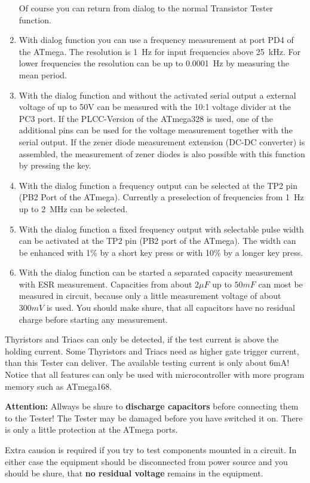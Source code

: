 \begin{enumerate}
Of course you can return from dialog to the normal Transistor Tester function.
\item With dialog function you can use a frequency measurement at port PD4 of the ATmega.
The resolution is 1~Hz for input frequencies above 25~kHz.
For lower frequencies the resolution can be up to 0.0001~Hz by measuring the mean period.
\item With the dialog function and without the activated serial output a external voltage of up to 50V can be measured with
the 10:1 voltage divider at the PC3 port. If the PLCC-Version of the ATmega328 is used, one of the additional
pins can be used for the voltage measurement together with the serial output.
If the zener diode measurement extension (DC-DC converter) is assembled, the measurement of
zener diodes is also possible with this function by pressing the key.
\item With the dialog function a frequency output can be selected at the TP2 pin (PB2 Port of the ATmega).
Currently a preselection of frequencies from 1~Hz up to 2~MHz can be selected.
\item With the dialog function a fixed frequency output with selectable pulse width can be activated at the TP2 pin
(PB2 port of the ATmega). The width can be enhanced with 1\% by a short key press or with 10\% by a longer key press.
\item With the dialog function can be started a separated capacity measurement with ESR measurement.
Capacities from about \(2 \mu F\) up to \(50 mF\) can most be measured in circuit, because only a little
measurement voltage of about \(300 mV\) is used.
You should make shure, that all capacitors have no residual charge before starting any measurement.

\end{enumerate}

Thyristors and Triacs can only be detected, if the test current is above the holding current.
Some Thyristors and Triacs need as higher gate trigger current, than this Tester can deliver.
The available testing current is only about 6mA!
Notice that all features can only be used with microcontroller with more program memory such as ATmega168.

\vspace{1cm}
\textbf{{\Large Attention:}} Allways be shure to {\bf discharge capacitors} before connecting them to the Tester!
The Tester may be damaged before you have switched it on. There is only a little protection at the ATmega ports.

Extra causion is required if you try to test components mounted in a circuit.
In either case the equipment should be disconnected from power source and you should be shure,
that {\bf no residual voltage} remains in the equipment.

